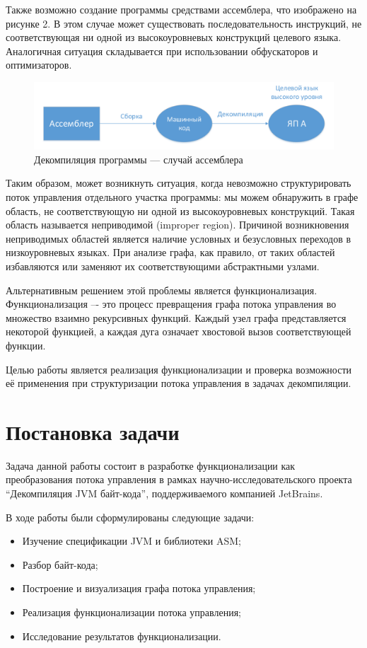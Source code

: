 \documentclass[14pt]{extarticle}
\begin{document}
Также возможно создание программы средствами ассемблера, что изображено на рисунке 2. В этом случае может существовать последовательность инструкций, не соответствующая ни одной из высокоуровневых конструкций целевого языка. Аналогичная ситуация складывается при использовании обфускаторов и оптимизаторов.

\begin{figure}[H]
\includegraphics[width=1\linewidth]{gr2.pdf} 
\caption{Декомпиляция программы --- случай ассемблера}
\end{figure}

\pagebreak
Таким образом, может возникнуть ситуация, когда невозможно структурировать поток управления отдельного участка программы: мы можем обнаружить в графе область, не соответствующую ни одной из высокоуровневых конструкций. Такая область называется неприводимой (improper region). Причиной возникновения неприводимых областей является наличие условных и безусловных переходов в низкоуровневых языках. При анализе графа, как правило, от таких областей избавляются или заменяют их соответствующими абстрактными узлами.

Альтернативным решением этой проблемы является функционализация. Функционализация –- это процесс превращения графа потока управления во множество взаимно рекурсивных функций. Каждый узел графа представляется некоторой функцией, а каждая дуга означает хвостовой вызов соответствующей функции.

Целью работы является реализация функционализации и проверка возможности её применения при структуризации потока управления в задачах декомпиляции.

\pagebreak

\section{Постановка задачи}
Задача данной работы состоит в разработке функционализации как преобразования потока управления в рамках научно-исследовательского проекта “Декомпиляция JVM байт-кода”, поддерживаемого компанией JetBrains. 

\vspace{0.3cm}
В ходе работы были сформулированы следующие задачи:
\begin{itemize}
\item Изучение спецификации JVM и библиотеки ASM;
\item Разбор байт-кода;
\item Построение и визуализация графа потока управления;
\item Реализация функционализации потока управления;
\item Исследование результатов функционализации.
\end{itemize}
\end{document}
